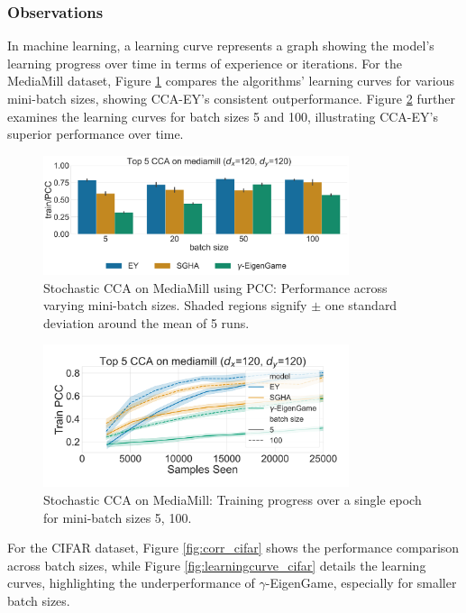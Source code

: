 \subsubsection{Observations}
In machine learning, a learning curve represents a graph showing the model's learning progress over time in terms of experience or iterations.
For the MediaMill dataset, Figure \ref{fig:corr_mediamill} compares the algorithms' learning curves for various mini-batch sizes, showing CCA-EY's consistent outperformance. Figure \ref{fig:learningcurve_mediamill} further examines the learning curves for batch sizes 5 and 100, illustrating CCA-EY's superior performance over time.

\begin{figure}
    \centering
    \includegraphics[width=0.8\textwidth]{figures/CCA/mediamill_models_different_batch_sizes}
    \caption{Stochastic CCA on MediaMill using PCC: Performance across varying mini-batch sizes. Shaded regions signify \(\pm\) one standard deviation around the mean of 5 runs.}
    \label{fig:corr_mediamill}
\end{figure}

\begin{figure}
    \centering
    \includegraphics[width=0.8\textwidth]{figures/CCA/mediamill_allbatchsizes_pcc}
    \caption{Stochastic CCA on MediaMill: Training progress over a single epoch for mini-batch sizes 5, 100.}
    \label{fig:learningcurve_mediamill}
\end{figure}

For the CIFAR dataset, Figure \ref{fig:corr_cifar} shows the performance comparison across batch sizes, while Figure \ref{fig:learningcurve_cifar} details the learning curves, highlighting the underperformance of $\gamma$-EigenGame, especially for smaller batch sizes.

